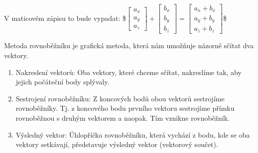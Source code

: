 \documentclass[letterpaper,10pt,english]{jupyterBook}
\begin{document}
\sphinxAtStartPar
V maticovém zápisu to bude vypadat:
\$\(\begin{bmatrix} a_x \\ a_y \\ a_z \end{bmatrix}  +  \begin{bmatrix} b_x \\ b_y \\ b_z \end{bmatrix} = \begin{bmatrix} a_x + b_x \\ a_y + b_y \\ a_z + b_z \end{bmatrix}\)\$

\sphinxAtStartPar
Metoda rovnoběžníku je grafická metoda, která nám umožňuje názorně sčítat dva vektory.

\sphinxAtStartPar
{}
\begin{enumerate}
%
\item {} 
\sphinxAtStartPar
Nakreslení vektorů: Oba vektory, které chceme sčítat, nakreslíme tak, aby jejich počáteční body splývaly.

\item {} 
\sphinxAtStartPar
Sestrojení rovnoběžníku: Z koncových bodů obou vektorů sestrojíme rovnoběžníky. Tj. z koncového bodu prvního vektoru sestrojíme přímku rovnoběžnou s druhým vektorem a naopak. Tím vznikne rovnoběžník.

\item {} 
\sphinxAtStartPar
Výsledný vektor: Úhlopříčka rovnoběžníku, která vychází z bodu, kde se oba vektory setkávají, představuje výsledný vektor (vektorový součet).

\end{enumerate}
\end{document}
